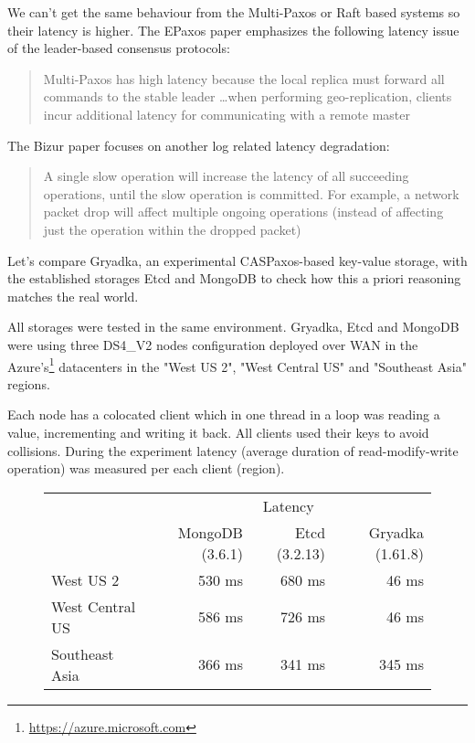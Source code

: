 \documentclass[12pt]{article}
\theoremstyle{definition}
\begin{document}
We can't get the same behaviour from the Multi-Paxos or Raft based systems so their latency is higher. The EPaxos paper emphasizes the following latency issue of the leader-based consensus protocols:

\begin{quote}
Multi-Paxos has high latency because the local replica must forward all commands to the stable leader \ldots when performing geo-replication, clients incur additional latency for communicating with a remote master
\end{quote}

The Bizur paper\cite{bizur} focuses on another log related latency degradation:

\begin{quote}
A single slow operation will increase the latency of all succeeding operations, until the slow operation is committed. For example, a network packet drop will affect multiple ongoing operations (instead of affecting just the operation within the dropped packet)
\end{quote}

Let's compare Gryadka, an experimental CASPaxos-based key-value storage, with the established storages Etcd and MongoDB to check how this a priori reasoning matches the real world.

All storages were tested in the same environment. Gryadka, Etcd and MongoDB were using three DS4\_V2 nodes configuration deployed over WAN in the Azure's\footnote{\href{https://azure.microsoft.com}{https://azure.microsoft.com}} datacenters in the "West US 2", "West Central US" and "Southeast Asia" regions.

Each node has a colocated client which in one thread in a loop was reading a value, incrementing and writing it back. All clients used their keys to avoid collisions. During the experiment latency (average duration of read-modify-write operation) was measured per each client (region).

\begin{figure}[!htb]
  \centering
  \begin{tabular}{c|r|r|r|}
  \cline{2-4}
  & \multicolumn{3}{|c|}{Latency} \\
  \cline{2-4}
  & MongoDB (3.6.1) & Etcd (3.2.13) & Gryadka (1.61.8) \\
  \hline
  \multicolumn{1}{|l|}{West US 2} & 530 ms & 680 ms & 46 ms \\
  \hline
  \multicolumn{1}{|l|}{West Central US} & 586 ms & 726 ms & 46 ms \\
  \hline
  \multicolumn{1}{|l|}{Southeast Asia} & 366 ms & 341 ms & 345 ms \\
  \hline
  \end{tabular}
\end{figure}
\end{document}
